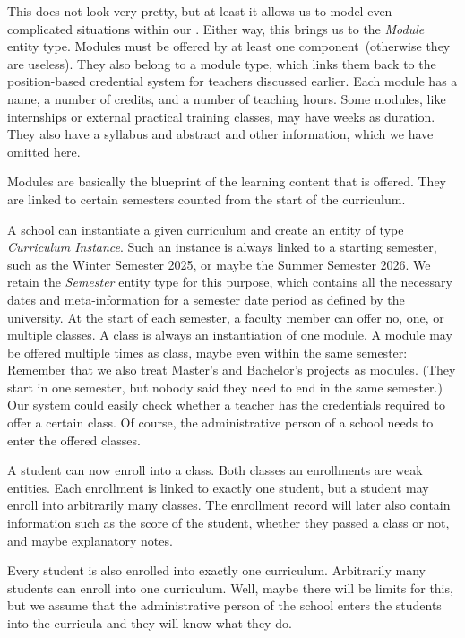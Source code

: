 This does not look very pretty, but at least it allows us to model even complicated situations within our \db.
Either way, this brings us to the \emph{Module} entity type.
Modules must be offered by at least one component~(otherwise they are useless).
They also belong to a module type, which links them back to the position-based credential system for teachers discussed earlier.
Each module has a name, a number of credits, and a number of teaching hours.
Some modules, like internships or external practical training classes, may have weeks as duration.
They also have a syllabus and abstract and other information, which we have omitted here.

Modules are basically the blueprint of the learning content that is offered.
They are linked to certain semesters counted from the start of the curriculum.

A school can instantiate a given curriculum and create an entity of type \emph{Curriculum Instance}.
Such an instance is always linked to a starting semester, such as the Winter Semester 2025, or maybe the Summer Semester 2026.
We retain the \emph{Semester} entity type for this purpose, which contains all the necessary dates and meta-information for a semester date period as defined by the university.
At the start of each semester, a faculty member can offer no, one, or multiple classes.
A class is always an instantiation of one module.
A module may be offered multiple times as class, maybe even within the same semester:
Remember that we also treat Master's and Bachelor's projects as modules.
(They start in one semester, but nobody said they need to end in the same semester.)
Our system could easily check whether a teacher has the credentials required to offer a certain class.
Of course, the administrative person of a school needs to enter the offered classes.

A student can now enroll into a class.
Both classes an enrollments are weak entities.
Each enrollment is linked to exactly one student, but a student may enroll into arbitrarily many classes.
The enrollment record will later also contain information such as the score of the student, whether they passed a class or not, and maybe explanatory notes.

Every student is also enrolled into exactly one curriculum.
Arbitrarily many students can enroll into one curriculum.
Well, maybe there will be limits for this, but we assume that the administrative person of the school enters the students into the curricula and they will know what they do.

